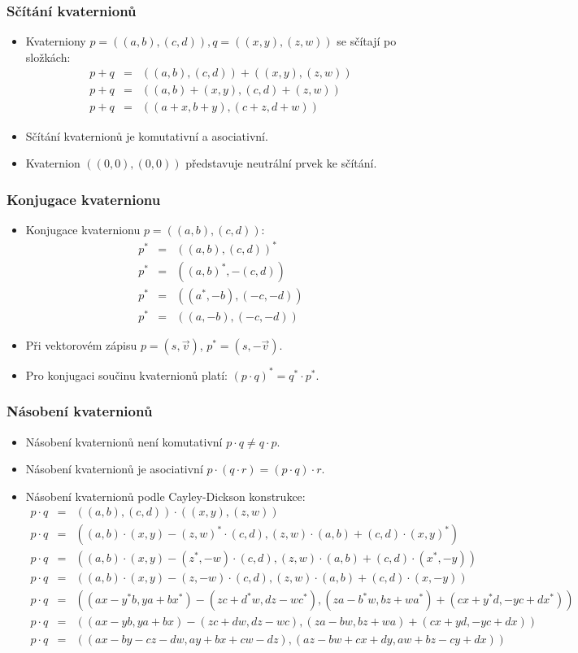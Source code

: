 \begin{frame}
\frametitle{Sčítání kvaternionů}
\begin{itemize}
\item Kvaterniony $p=((a,b),(c,d)),q=((x,y),(z,w))$ se sčítají po složkách:
\begin{eqnarray*}
p+q &=& ((a,b),(c,d))+((x,y),(z,w))\\
p+q &=& ((a,b)+(x,y),(c,d)+(z,w))\\
p+q &=& ((a+x,b+y),(c+z,d+w))
\end{eqnarray*}
\item Sčítání kvaternionů je komutativní a asociativní.
\item Kvaternion $((0,0),(0,0))$ představuje neutrální prvek ke sčítání.
\end{itemize}
\end{frame}

\begin{frame}
\frametitle{Konjugace kvaternionu}
\begin{itemize}
\item Konjugace kvaternionu $p=((a,b),(c,d))$:
\begin{eqnarray*}
p^* &=& ((a,b),(c,d))^*\\
p^* &=& ((a,b)^*,-(c,d))\\
p^* &=& ((a^*,-b),(-c,-d))\\
p^* &=& ((a,-b),(-c,-d))
\end{eqnarray*}
\item Při vektorovém zápisu $p=(s,\vec v)$, $p^*=(s,-\vec v)$.
\item Pro konjugaci součinu kvaternionů platí: $(p \cdot q)^*= q^* \cdot p^*$.
\end{itemize}
\end{frame}

\begin{frame}
\frametitle{Násobení kvaternionů}
\begin{itemize}
\item Násobení kvaternionů není komutativní $p\cdot q \neq q \cdot p$.
\item Násobení kvaternionů je asociativní $p\cdot(q\cdot r)=(p\cdot q)\cdot r$.
\item Násobení kvaternionů podle Cayley-Dickson konstrukce:
{\tiny
\begin{eqnarray*}
p\cdot q &=& ((a,b),(c,d))\cdot((x,y),(z,w))\\
p\cdot q &=& ((a,b)\cdot(x,y)-(z,w)^*\cdot(c,d),(z,w)\cdot(a,b)+(c,d)\cdot(x,y)^*)\\
p\cdot q &=& ((a,b)\cdot(x,y)-(z^*,-w)\cdot(c,d),(z,w)\cdot(a,b)+(c,d)\cdot(x^*,-y))\\
p\cdot q &=& ((a,b)\cdot(x,y)-(z,-w)\cdot(c,d),(z,w)\cdot(a,b)+(c,d)\cdot(x,-y))\\
p\cdot q &=& ((ax-y^*b,ya+bx^*)-(zc+d^*w,dz-wc^*),(za-b^*w,bz+wa^*)+(cx+y^*d,-yc+dx^*))\\
p\cdot q &=& ((ax-yb,ya+bx)-(zc+dw,dz-wc),(za-bw,bz+wa)+(cx+yd,-yc+dx))\\
p\cdot q &=& ((ax-by-cz-dw,ay+bx+cw-dz),(az-bw+cx+dy,aw+bz-cy+dx))
\end{eqnarray*}
}
\end{itemize}
\end{frame}

